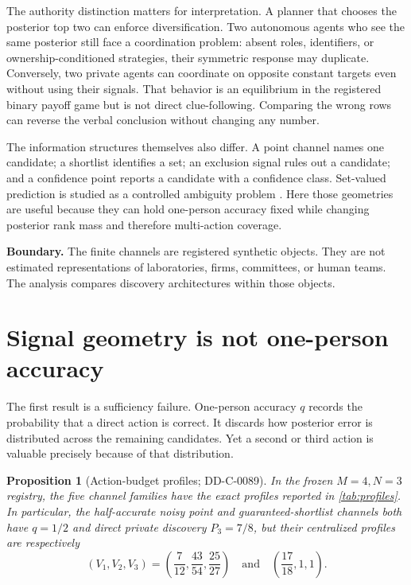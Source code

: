 \documentclass[12pt]{article}
\newcommand{\Boundary}[1]{\par\noindent\textbf{Boundary.} #1\par}
\newtheorem{proposition}[theorem]{Proposition}
\theoremstyle{definition}
\begin{document}
The authority distinction matters for interpretation. A planner that chooses
the posterior top two can enforce diversification. Two autonomous agents who
see the same posterior still face a coordination problem: absent roles,
identifiers, or ownership-conditioned strategies, their symmetric response may
duplicate. Conversely, two private agents can coordinate on opposite constant
targets even without using their signals. That behavior is an equilibrium in
the registered binary payoff game but is not direct clue-following. Comparing
the wrong rows can reverse the verbal conclusion without changing any number.

The information structures themselves also differ. A point channel names one
candidate; a shortlist identifies a set; an exclusion signal rules out a
candidate; and a confidence point reports a candidate with a confidence class.
Set-valued prediction is studied as a controlled ambiguity problem
\citep{MortierEtAl2021,SadinleEtAl2019}. Here those geometries are useful because
they can hold one-person accuracy fixed while changing posterior rank mass and
therefore multi-action coverage.

\Boundary{The finite channels are registered synthetic objects. They are not
estimated representations of laboratories, firms, committees, or human teams.
The analysis compares discovery architectures within those objects.}

\section{Signal geometry is not one-person accuracy}

The first result is a sufficiency failure. One-person accuracy $q$ records the
probability that a direct action is correct. It discards how posterior error is
distributed across the remaining candidates. Yet a second or third action is
valuable precisely because of that distribution.

\begin{proposition}[Action-budget profiles; DD-C-0089]
In the frozen $M=4,N=3$ registry, the five channel families have the exact
profiles reported in \cref{tab:profiles}. In particular, the half-accurate noisy
point and guaranteed-shortlist channels both have $q=1/2$ and direct private
discovery $P_3=7/8$, but their centralized profiles are respectively
\[
 (V_1,V_2,V_3)=\left(\frac{7}{12},\frac{43}{54},\frac{25}{27}\right)
 \quad\text{and}\quad
 \left(\frac{17}{18},1,1\right).
\]
\end{proposition}
\end{document}
